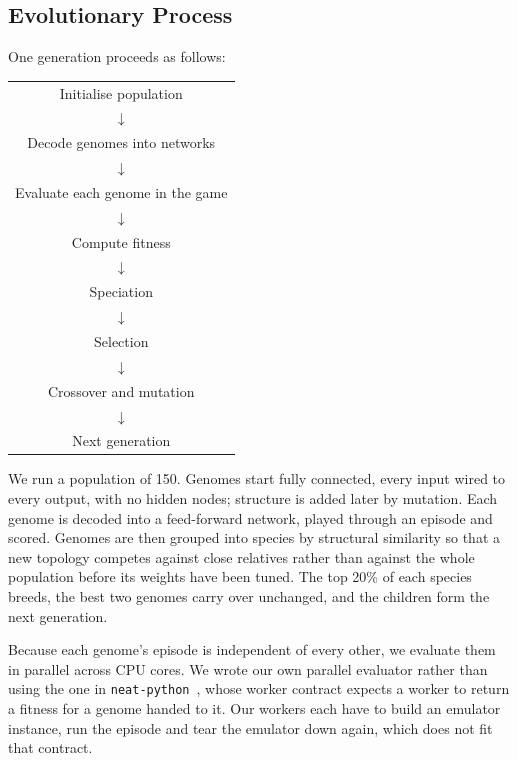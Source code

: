 \subsection{Evolutionary Process}
\label{subsec:evolution-loop}

One generation proceeds as follows:

\begin{center}
\begin{tabular}{c}
Initialise population \\
$\downarrow$ \\
Decode genomes into networks \\
$\downarrow$ \\
Evaluate each genome in the game \\
$\downarrow$ \\
Compute fitness \\
$\downarrow$ \\
Speciation \\
$\downarrow$ \\
Selection \\
$\downarrow$ \\
Crossover and mutation \\
$\downarrow$ \\
Next generation \\
\end{tabular}
\end{center}

\noindent
We run a population of 150. Genomes start fully connected, every input wired
to every output, with no hidden nodes; structure is added later by mutation.
Each genome is decoded into a feed-forward network, played through an episode
and scored. Genomes are then grouped into species by structural similarity so
that a new topology competes against close relatives rather than against the
whole population before its weights have been tuned. The top 20\% of each
species breeds, the best two genomes carry over unchanged, and the children
form the next generation.

\noindent
Because each genome's episode is independent of every other, we evaluate them
in parallel across CPU cores. We wrote our own parallel evaluator rather than
using the one in \texttt{neat-python}~\cite{neatpython}, whose worker contract expects a worker
to return a fitness for a genome handed to it. Our workers each have to build
an emulator instance, run the episode and tear the emulator down again, which
does not fit that contract.

